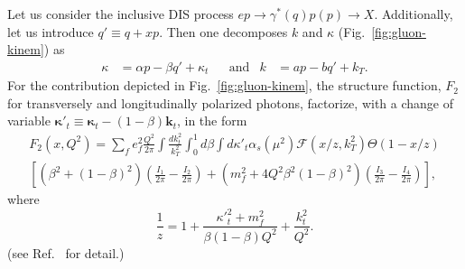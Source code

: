 \documentclass[12pt]{article}
\numberwithin{equation}{section}
\numberwithin{table}{section}
\numberwithin{figure}{section}
\begin{document}
Let us consider the inclusive DIS process $e p\rightarrow \gamma^* (q) p(p)\rightarrow X$. %
Additionally, let us introduce $q'\equiv q+x p$. 
Then one  decomposes $k$ and $\kappa$ (Fig.~\ref{fig:gluon-kinem}) as
\begin{align}
    \kappa&=\alpha p-\beta q'+\kappa_t&&\mathrm{and}& k&=a p- bq'+k_T.
\end{align}
For the contribution depicted in Fig.~\ref{fig:gluon-kinem}, the structure function, $F_2$ for transversely and longitudinally polarized photons, factorize, with a change of variable  ${\boldsymbol{\kappa}'}_t\equiv{\boldsymbol{\kappa}_t}-(1-\beta)\mathbf{k}_t$, in the form~\cite{ Kimber:2001uaa,Kwiecinski:1997ee}
\begin{multline}
	F_2(x,Q^2)=\sum_f e_f^2 \frac{Q^2}{2\pi}\int\frac{dk^2_t}{k_T^2}\int^1_0d\beta\int d{\kappa'}_t\alpha_s(\mu^2) \mathcal{F}(x/z,k_T^2)\Theta(1-x/z)\\
	\left[\left(\beta^2+(1-\beta)^2\right)\left(\frac{I_1}{2\pi}-\frac{I_2}{2\pi}\right)
	+\left(m_f^2+4Q^2\beta^2(1-\beta)^2\right)\left(\frac{I_3}{2\pi}-\frac{I_4}{2\pi}\right)\right],
	\label{eq:angle-integrated}
\end{multline}
where
\begin{equation}
	\frac{1}{z}=1+\frac{{\kappa'}^2_t+m_f^2}{\beta(1-\beta)Q^2}+\frac{k^2_t}{Q^2}.
	\label{eq:z}
\end{equation}
(see Ref.~\cite{ Kimber:2001uaa,Kwiecinski:1997ee} for detail.)
\end{document}
